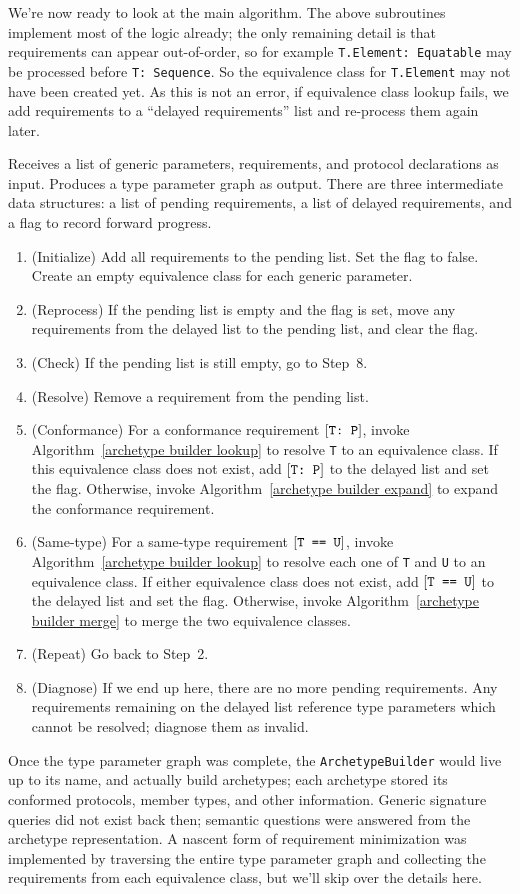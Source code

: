 \documentclass[../generics]{subfiles}
\begin{document}
We're now ready to look at the main algorithm. The above subroutines implement most of the logic already; the only remaining detail is that requirements can appear out-of-order, so for example \texttt{T.Element:~Equatable} may be processed before \texttt{T:~Sequence}. So the equivalence class for \texttt{T.Element} may not have been created yet. As this is not an error, if equivalence class lookup fails, we add requirements to a ``delayed requirements'' list and re-process them again later.
\begin{algorithm}\label{archetypebuilder} Receives a list of generic parameters, requirements, and protocol declarations as input. Produces a type parameter graph as output.
There are three intermediate data structures: a list of pending requirements, a list of delayed requirements, and a flag to record forward progress.
\begin{enumerate}
\item (Initialize) Add all requirements to the pending list. Set the flag to false. Create an empty equivalence class for each generic parameter.
\item (Reprocess) If the pending list is empty and the flag is set, move any requirements from the delayed list to the pending list, and clear the flag.
\item (Check) If the pending list is still empty, go to Step~8.
\item (Resolve) Remove a requirement from the pending list.
\item (Conformance) For a conformance requirement $[\texttt{T:~P}]$, invoke Algorithm~\ref{archetype builder lookup} to resolve \texttt{T} to an equivalence class. If this equivalence class does not exist, add $[\texttt{T:~P}]$ to the delayed list and set the flag. Otherwise, invoke Algorithm~\ref{archetype builder expand} to expand the conformance requirement.
\item (Same-type) For a same-type requirement $[\texttt{T == U}]$, invoke Algorithm~\ref{archetype builder lookup} to resolve each one of \texttt{T} and \texttt{U} to an equivalence class. If either equivalence class does not exist, add $[\texttt{T == U}]$ to the delayed list and set the flag. Otherwise, invoke Algorithm~\ref{archetype builder merge} to merge the two equivalence classes.
\item (Repeat) Go back to Step~2.
\item (Diagnose) If we end up here, there are no more pending requirements. Any requirements remaining on the delayed list reference type parameters which cannot be resolved; diagnose them as invalid.
\end{enumerate}
\end{algorithm}
Once the type parameter graph was complete, the \texttt{ArchetypeBuilder} would live up to its name, and actually build archetypes; each archetype stored its conformed protocols, member types, and other information. Generic signature queries did not exist back then; semantic questions were answered from the archetype representation. A nascent form of requirement minimization was implemented by traversing the entire type parameter graph and collecting the requirements from each equivalence class, but we'll skip over the details here.
\end{document}
